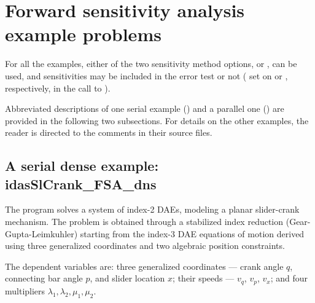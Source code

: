 \section{Forward sensitivity analysis example problems}\label{s:fwd_ex}

For all the {\idas} examples, either of the two sensitivity method options,
 or , can be used, 
and sensitivities may be included in the error test or not 
( set on  or , respectively, in the
call to ).

Abbreviated descriptions of one serial example ()
and a parallel one () are provided in the following
two subsections.  For details on the other examples, the reader is
directed to the comments in their source files.

\subsection{A serial dense example: idasSlCrank\_FSA\_dns}
\label{ss:idasSlCrank_FSA_dns}

The  program solves a system of index-2 DAEs, modeling a
planar slider-crank mechanism.  The problem is obtained through a stabilized index
reduction (Gear-Gupta-Leimkuhler) starting from the index-3 DAE equations of motion
derived using three generalized coordinates and two algebraic position constraints.

The dependent variables are: three generalized coordinates --- crank
angle $q$, connecting bar angle $p$, and slider location $x$; their
speeds --- $v_q$, $v_p$, $v_x$; and four multipliers
$\lambda_1, \lambda_2, \mu_1, \mu_2$.

